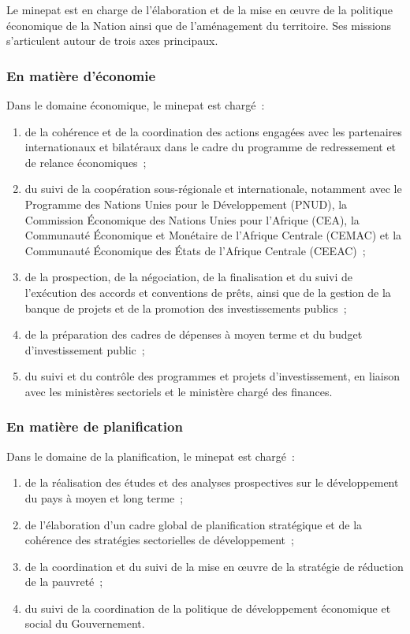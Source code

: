 \documentclass[12pt, a4paper, oneside]{report}
\begin{document}
Le \gls{minepat} est en charge de l'élaboration et de la mise en \oe uvre de la
politique économique de la Nation ainsi que de l'aménagement du territoire. Ses
missions s'articulent autour de trois axes principaux.

\subsubsection{En matière d'économie}

Dans le domaine économique, le \gls{minepat} est chargé~:
\begin{enumerate}
	\item de la cohérence et de la coordination des actions engagées avec les partenaires
	internationaux et bilatéraux dans le cadre du programme de redressement et de
	relance économiques~;
	\item du suivi de la coopération sous-régionale et internationale, notamment avec le
	Programme des Nations Unies pour le Développement (PNUD), la Commission
	Économique des Nations Unies pour l'Afrique (CEA), la Communauté Économique
	et Monétaire de l'Afrique Centrale (CEMAC) et la Communauté Économique des
	États de l'Afrique Centrale (CEEAC)~;
	\item de la prospection, de la négociation, de la finalisation et du suivi de
	l'exécution des accords et conventions de prêts, ainsi que de la gestion de
	la banque de projets et de la promotion des investissements publics~;
	\item de la préparation des cadres de dépenses à moyen terme et du budget
	d'investissement public~;
	\item du suivi et du contrôle des programmes et projets d'investissement, en liaison
	avec les ministères sectoriels et le ministère chargé des finances.
\end{enumerate}

\subsubsection{En matière de planification}

Dans le domaine de la planification, le \gls{minepat} est chargé~:
\begin{enumerate}
	\item de la réalisation des études et des analyses prospectives sur le développement
	du pays à moyen et long terme~;
	\item de l'élaboration d'un cadre global de planification stratégique et de la
	cohérence des stratégies sectorielles de développement~;
	\item de la coordination et du suivi de la mise en \oe uvre de la stratégie de
	réduction de la pauvreté~;
	\item du suivi de la coordination de la politique de développement économique et
	social du Gouvernement.
\end{enumerate}
\end{document}
